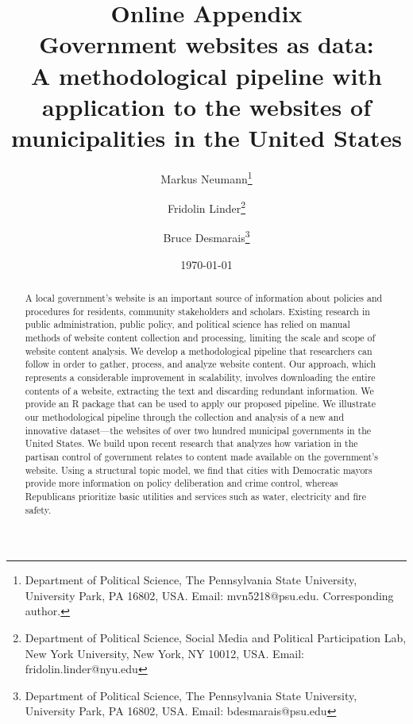 \documentclass[11pt]{article}
\title{\vspace{-2cm} {\bf Online Appendix} \\ Government websites as data: \\ A methodological pipeline with application to the websites of municipalities in the United States}
\author{ Markus Neumann\footnote{Department of Political Science, The Pennsylvania State University, University Park, PA 16802, USA. Email: mvn5218@psu.edu. Corresponding author.} \and Fridolin Linder\footnote{Department of Political Science, Social Media and Political Participation Lab, New York University, New York, NY 10012, USA. Email: fridolin.linder@nyu.edu} \and Bruce Desmarais\footnote{Department of Political Science, The Pennsylvania State University, University Park, PA 16802, USA. Email: bdesmarais@psu.edu}} \date{\today}
\begin{document}
\maketitle




\begin{abstract}

A local government's website is an important source of information about policies and procedures for residents, community stakeholders and scholars. Existing research in public administration, public policy, and political science has relied on manual methods of website content collection and processing, limiting the scale and scope of website content analysis. We develop a methodological pipeline that researchers can follow in order to gather, process, and analyze website content. Our approach, which represents a considerable improvement in scalability, involves downloading the entire contents of a website, extracting the text and discarding redundant information. We provide an R package that can be used to apply our proposed pipeline. We illustrate our methodological pipeline through the collection and analysis of a new and innovative dataset---the websites of over two hundred municipal governments in the United States. We build upon recent research that analyzes how variation in the partisan control of government relates to content made available on the government's website. Using a structural topic model, we find that cities with Democratic mayors provide more information on policy deliberation and crime control, whereas Republicans prioritize basic utilities and services such as water, electricity and fire safety.

\end{abstract}
\thispagestyle{empty}
\doublespacing
\end{document}
